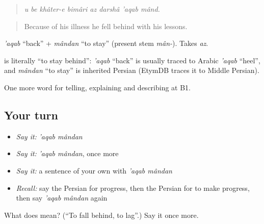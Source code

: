 \begin{quote}
\emph{u be khâter-e bimâri az darshâ 'aqab mând.}
\end{quote}

\begin{quote}
Because of his illness he fell behind with his lessons.
\end{quote}

\emph{'aqab} \textquotedblleft{}back\textquotedblright{} + \emph{mândan} \textquotedblleft{}to stay\textquotedblright{} (present stem \emph{mân-}). Takes \emph{az}.

\begin{cousinweb}
\textbf{ } is literally \textquotedblleft{}to stay behind\textquotedblright{}: \emph{'aqab} \textquotedblleft{}back\textquotedblright{} is usually traced to Arabic \emph{'aqab} \textquotedblleft{}heel\textquotedblright{}, and \emph{mândan} \textquotedblleft{}to stay\textquotedblright{} is inherited Persian (EtymDB traces it to Middle Persian).
\end{cousinweb}

\begin{grammarlens}[title={What you've built}]
One more word for telling, explaining and describing at B1.
\end{grammarlens}

\subsection*{Your turn}
\begin{itemize}
\raggedright
  \item \emph{Say it:} \emph{'aqab mândan}
  \item \emph{Say it:} \emph{'aqab mândan}, once more
  \item \emph{Say it:} a sentence of your own with \emph{'aqab mândan}
  \item \emph{Recall:} say the Persian for progress, then the Persian for to make progress, then say \emph{'aqab mândan} again
\end{itemize}

\begin{tcolorbox}[breakable,colback=teal!4,colframe=teal!35!black,title={Before you move on}]
What does   mean? (\textquotedblleft{}To fall behind, to lag\textquotedblright{}.) Say it once more.
\end{tcolorbox}
